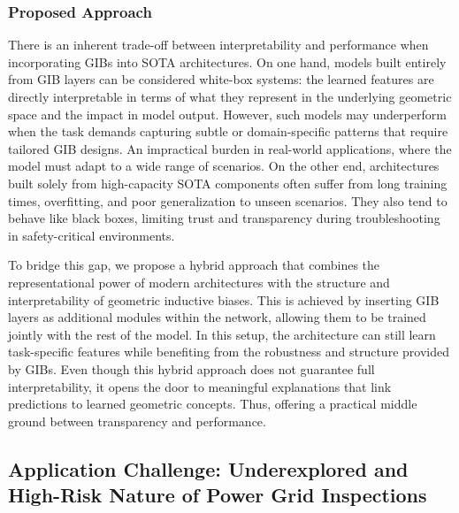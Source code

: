 \subsubsection{Proposed Approach}
%
There is an inherent trade-off between interpretability and performance when
incorporating GIBs into SOTA architectures. On one hand, models built entirely
from GIB layers can be considered white-box systems: the learned features are
directly interpretable in terms of what they represent in the underlying
geometric space and the impact in model output.
%
However, such models may underperform when the task demands capturing subtle or
domain-specific patterns that require tailored GIB designs. An impractical
burden in real-world applications, where the model must adapt to a wide range
of scenarios.
%
On the other end, architectures built solely from high-capacity SOTA components
often suffer from long training times, overfitting, and poor generalization to
unseen scenarios. They also tend to behave like black boxes, limiting trust and
transparency during troubleshooting in safety-critical environments.
%

To bridge this gap, we propose a hybrid approach that combines the
representational power of modern architectures with the structure and
interpretability of geometric inductive biases.
%
This is achieved by inserting GIB layers as additional modules within the
network, allowing them to be trained jointly with the rest of the model. In
this setup, the architecture can still learn task-specific features while
benefiting from the robustness and structure provided by GIBs.
%
Even though this hybrid approach does not guarantee full interpretability, it
opens the door to meaningful explanations that link predictions to learned
geometric concepts. Thus, offering a practical middle ground between
transparency and performance.

\subsection{Application Challenge: Underexplored and High-Risk Nature of Power Grid Inspections}

